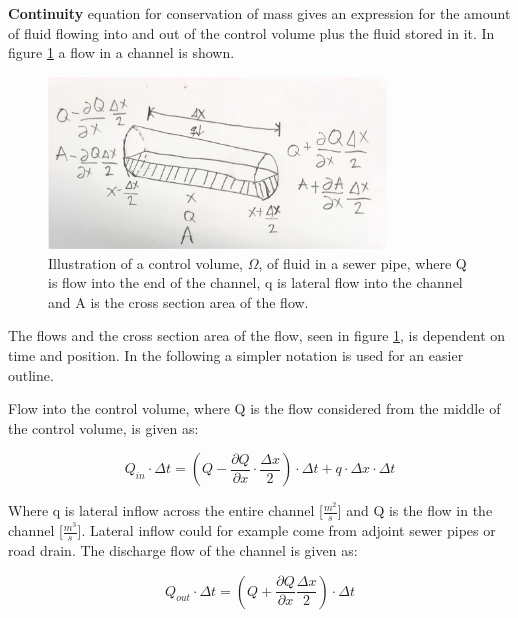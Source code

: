 \textbf{Continuity} equation for conservation of mass gives an expression for the amount of fluid flowing into and out of the control volume plus the fluid stored in it. 
In figure \ref{fig:firkant_kloak} a flow in a channel is shown. 

\begin{figure}[H]
\centering
\includegraphics[width=0.8\textwidth]{report/modeling/pictures/continuity_open_channel.jpg}
\caption{Illustration of a control volume, $\Omega$, of fluid in a sewer pipe, where Q is flow into the end of the channel, q is lateral flow into the channel and A is the cross section area of the flow.}
\label{fig:firkant_kloak}
\end{figure}

The flows and the cross section area of the flow, seen in figure \ref{fig:firkant_kloak}, is dependent on time and position. In the following a simpler notation is used for an easier outline. 

Flow into the control volume, where Q is the flow considered from the middle of the control volume, is given as:

\begin{equation}
Q_{in} \cdot \Delta t =	\left(Q - \frac{\partial Q}{\partial x}\cdot \frac{\Delta x}{2}\right) \cdot \Delta t + q \cdot \Delta x \cdot \Delta t
\label{flowin_saintbernard}
\end{equation}

Where q is lateral inflow across the entire channel [$\frac{m^2}{s}$] and Q is the flow in the channel [$\frac{m^3}{s}$]. Lateral inflow could for example come from adjoint sewer pipes or road drain.
The discharge flow of the channel is given as:

\begin{equation}
Q_{out} \cdot \Delta t =\left(Q + \frac{\partial Q}{ \partial x} \frac{\Delta x}{2} \right) \cdot \Delta t 
\label{flowout_saintbernard}
\end{equation}

